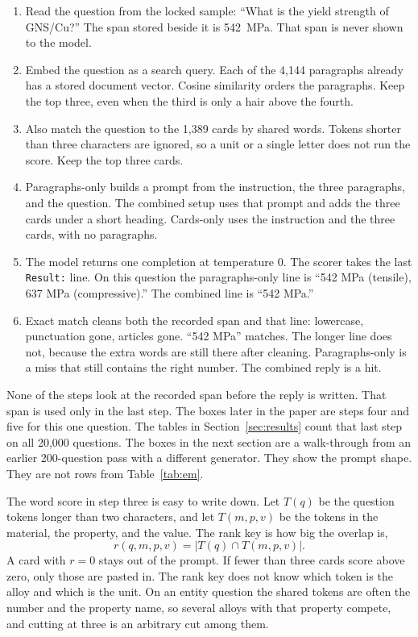 \documentclass[conference]{IEEEtran}
\begin{document}
\begin{enumerate}
\item Read the question from the locked sample: ``What is the yield strength of GNS/Cu?'' The span stored beside it is 542~MPa. That span is never shown to the model.
\item Embed the question as a search query. Each of the 4{,}144 paragraphs already has a stored document vector. Cosine similarity orders the paragraphs. Keep the top three, even when the third is only a hair above the fourth.
\item Also match the question to the 1{,}389 cards by shared words. Tokens shorter than three characters are ignored, so a unit or a single letter does not run the score. Keep the top three cards.
\item Paragraphs-only builds a prompt from the instruction, the three paragraphs, and the question. The combined setup uses that prompt and adds the three cards under a short heading. Cards-only uses the instruction and the three cards, with no paragraphs.
\item The model returns one completion at temperature 0. The scorer takes the last \texttt{Result:} line. On this question the paragraphs-only line is ``542 MPa (tensile), 637 MPa (compressive).'' The combined line is ``542 MPa.''
\item Exact match cleans both the recorded span and that line: lowercase, punctuation gone, articles gone. ``542 MPa'' matches. The longer line does not, because the extra words are still there after cleaning. Paragraphs-only is a miss that still contains the right number. The combined reply is a hit.
\end{enumerate}

None of the steps look at the recorded span before the reply is written. That span is used only in the last step. The boxes later in the paper are steps four and five for this one question. The tables in Section~\ref{sec:results} count that last step on all 20{,}000 questions. The boxes in the next section are a walk-through from an earlier 200-question pass with a different generator. They show the prompt shape. They are not rows from Table~\ref{tab:em}.

The word score in step three is easy to write down. Let \(T(q)\) be the question tokens longer than two characters, and let \(T(m,p,v)\) be the tokens in the material, the property, and the value. The rank key is how big the overlap is,
\begin{equation}
r(q, m, p, v) = \lvert T(q) \cap T(m, p, v) \rvert.
\end{equation}
A card with \(r=0\) stays out of the prompt. If fewer than three cards score above zero, only those are pasted in. The rank key does not know which token is the alloy and which is the unit. On an entity question the shared tokens are often the number and the property name, so several alloys with that property compete, and cutting at three is an arbitrary cut among them.
\end{document}
